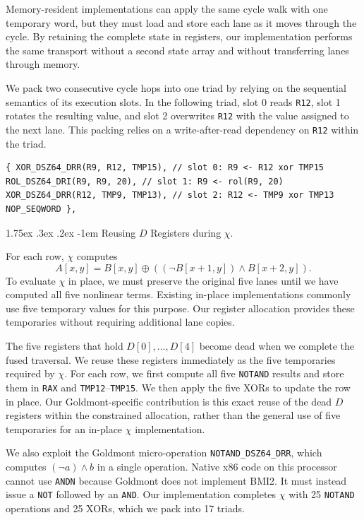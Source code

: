 \documentclass[journal=tches,submission]{iacrtrans}
\makeatletter
\newcommand{\code}[1]{\texttt{#1}}
\renewcommand\paragraph{\@startsection{paragraph}{4}{\z@}%
      {1.75ex \@plus .3ex \@minus .2ex}%
      {-1em}%
      {\normalfont\normalsize\bfseries\SS@parafont}}
\makeatother
\begin{document}
Memory-resident implementations can apply the same cycle walk with one temporary word, but they must load and store each lane as it moves through the cycle. 
By retaining the complete state in registers, our implementation performs the same transport without a second state array and without transferring lanes through memory.

We pack two consecutive cycle hops into one triad by relying on the sequential semantics of its execution slots. 
In the following triad, slot 0 reads \code{R12}, slot 1 rotates the resulting value, and slot 2 overwrites \code{R12} with the value assigned to the next lane. 
This packing relies on a write-after-read dependency on \code{R12} within the triad.

\begin{lstlisting}
{ XOR_DSZ64_DRR(R9, R12, TMP15), // slot 0: R9 <- R12 xor TMP15
ROL_DSZ64_DRI(R9, R9, 20), // slot 1: R9 <- rol(R9, 20)
XOR_DSZ64_DRR(R12, TMP9, TMP13), // slot 2: R12 <- TMP9 xor TMP13
NOP_SEQWORD },
\end{lstlisting}

\paragraph{Reusing $D$ Registers during $\chi$.}
\label{sec:chireuse}

For each row, $\chi$ computes
\[
A[x,y]=B[x,y]\oplus((\lnot B[x+1,y])\wedge B[x+2,y]).
\]
To evaluate $\chi$ in place, we must preserve the original five lanes until we have computed all five nonlinear terms. 
Existing in-place implementations commonly use five temporary values for this purpose. 
Our register allocation provides these temporaries without requiring additional lane copies.

The five registers that hold $D[0],\ldots,D[4]$ become dead when we complete the fused traversal. 
We reuse these registers immediately as the five temporaries required by $\chi$. 
For each row, we first compute all five \code{NOTAND} results and store them in \code{RAX} and \code{TMP12}--\code{TMP15}. 
We then apply the five XORs to update the row in place. 
Our Goldmont-specific contribution is this exact reuse of the dead $D$ registers within the constrained allocation, rather than the general use of five temporaries for an in-place $\chi$ implementation.

We also exploit the Goldmont micro-operation \code{NOTAND\_DSZ64\_DRR}, which computes $(\lnot a)\wedge b$ in a single operation. 
Native x86 code on this processor cannot use \code{ANDN} because Goldmont does not implement BMI2. 
It must instead issue a \code{NOT} followed by an \code{AND}. 
Our implementation completes $\chi$ with 25 \code{NOTAND} operations and 25 XORs, which we pack into 17 triads.
\end{document}
